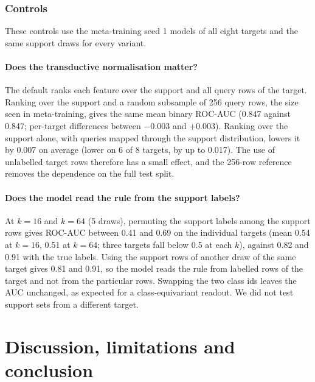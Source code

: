 \documentclass[pdflatex,sn-mathphys-num]{sn-jnl}%
\begin{document}
\subsubsection{Controls}\label{sec:fewcontrols}
These controls use the meta-training seed 1 models of all eight targets and the same support draws for every variant.

\paragraph{Does the transductive normalisation matter?}
The default ranks each feature over the support and all query rows of the target. Ranking over the support and a random subsample of 256 query rows, the size seen in meta-training, gives the same mean binary ROC-AUC (0.847 against 0.847; per-target differences between $-0.003$ and $+0.003$). Ranking over the support alone, with queries mapped through the support distribution, lowers it by 0.007 on average (lower on 6 of 8 targets, by up to 0.017). The use of unlabelled target rows therefore has a small effect, and the 256-row reference removes the dependence on the full test split.

\paragraph{Does the model read the rule from the support labels?}
At $k{=}16$ and $k{=}64$ (5 draws), permuting the support labels among the support rows gives ROC-AUC between 0.41 and 0.69 on the individual targets (mean 0.54 at $k{=}16$, 0.51 at $k{=}64$; three targets fall below 0.5 at each $k$), against 0.82 and 0.91 with the true labels. Using the support rows of another draw of the same target gives 0.81 and 0.91, so the model reads the rule from labelled rows of the target and not from the particular rows. Swapping the two class ids leaves the AUC unchanged, as expected for a class-equivariant readout. We did not test support sets from a different target.

\section{Discussion, limitations and conclusion}\label{sec:disc}
\end{document}
